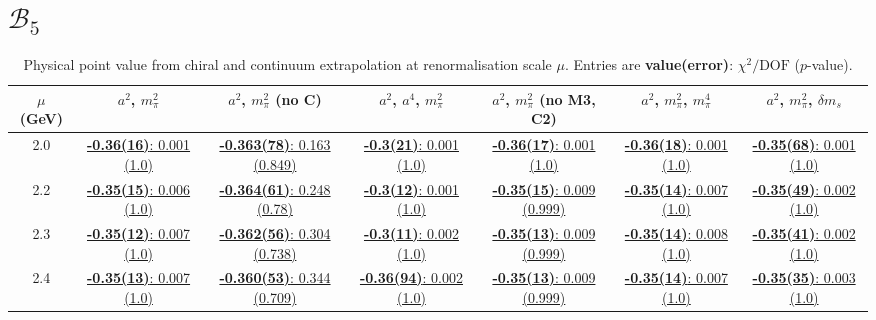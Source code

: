 \documentclass[12pt]{extarticle}
\begin{document}
\section{$\mathcal{B}_5$}
\begin{table}[h!]
\begin{center}
\begin{tabular}{|c|c|c|c|c|c|c|}
\hline
$\mu$ (GeV) & $a^2$, $m_\pi^2$& $a^2$, $m_\pi^2$ (no C)& $a^2$, $a^4$, $m_\pi^2$& $a^2$, $m_\pi^2$ (no M3, C2)& $a^2$, $m_\pi^2$, $m_\pi^4$& $a^2$, $m_\pi^2$, $\delta m_s$\\
\hline
2.0& \hyperlink{TT/NPR/a2m2_20.pdf.1}{\textbf{-0.36(16)}: 0.001 (1.0)} & \hyperlink{TT/NPR/a2m2noC_20.pdf.1}{\textbf{-0.363(78)}: 0.163 (0.849)} & \hyperlink{TT/NPR/a2a4m2_20.pdf.1}{\textbf{-0.3(21)}: 0.001 (1.0)} & \hyperlink{TT/NPR/a2m2mcut_20.pdf.1}{\textbf{-0.36(17)}: 0.001 (1.0)} & \hyperlink{TT/NPR/a2m2m4_20.pdf.1}{\textbf{-0.36(18)}: 0.001 (1.0)} & \hyperlink{TT/NPR/a2m2delm_20.pdf.1}{\textbf{-0.35(68)}: 0.001 (1.0)}\\
2.2& \hyperlink{TT/NPR/a2m2_22.pdf.1}{\textbf{-0.35(15)}: 0.006 (1.0)} & \hyperlink{TT/NPR/a2m2noC_22.pdf.1}{\textbf{-0.364(61)}: 0.248 (0.78)} & \hyperlink{TT/NPR/a2a4m2_22.pdf.1}{\textbf{-0.3(12)}: 0.001 (1.0)} & \hyperlink{TT/NPR/a2m2mcut_22.pdf.1}{\textbf{-0.35(15)}: 0.009 (0.999)} & \hyperlink{TT/NPR/a2m2m4_22.pdf.1}{\textbf{-0.35(14)}: 0.007 (1.0)} & \hyperlink{TT/NPR/a2m2delm_22.pdf.1}{\textbf{-0.35(49)}: 0.002 (1.0)}\\
2.3& \hyperlink{TT/NPR/a2m2_23.pdf.1}{\textbf{-0.35(12)}: 0.007 (1.0)} & \hyperlink{TT/NPR/a2m2noC_23.pdf.1}{\textbf{-0.362(56)}: 0.304 (0.738)} & \hyperlink{TT/NPR/a2a4m2_23.pdf.1}{\textbf{-0.3(11)}: 0.002 (1.0)} & \hyperlink{TT/NPR/a2m2mcut_23.pdf.1}{\textbf{-0.35(13)}: 0.009 (0.999)} & \hyperlink{TT/NPR/a2m2m4_23.pdf.1}{\textbf{-0.35(14)}: 0.008 (1.0)} & \hyperlink{TT/NPR/a2m2delm_23.pdf.1}{\textbf{-0.35(41)}: 0.002 (1.0)}\\
2.4& \hyperlink{TT/NPR/a2m2_24.pdf.1}{\textbf{-0.35(13)}: 0.007 (1.0)} & \hyperlink{TT/NPR/a2m2noC_24.pdf.1}{\textbf{-0.360(53)}: 0.344 (0.709)} & \hyperlink{TT/NPR/a2a4m2_24.pdf.1}{\textbf{-0.36(94)}: 0.002 (1.0)} & \hyperlink{TT/NPR/a2m2mcut_24.pdf.1}{\textbf{-0.35(13)}: 0.009 (0.999)} & \hyperlink{TT/NPR/a2m2m4_24.pdf.1}{\textbf{-0.35(14)}: 0.007 (1.0)} & \hyperlink{TT/NPR/a2m2delm_24.pdf.1}{\textbf{-0.35(35)}: 0.003 (1.0)}\\
\hline
\end{tabular}
\caption{Physical point value from chiral and continuum extrapolation at renormalisation scale $\mu$. Entries are \textbf{value(error)}: $\chi^2/\text{DOF}$ ($p$-value).}
\end{center}
\end{table}
\end{document}
